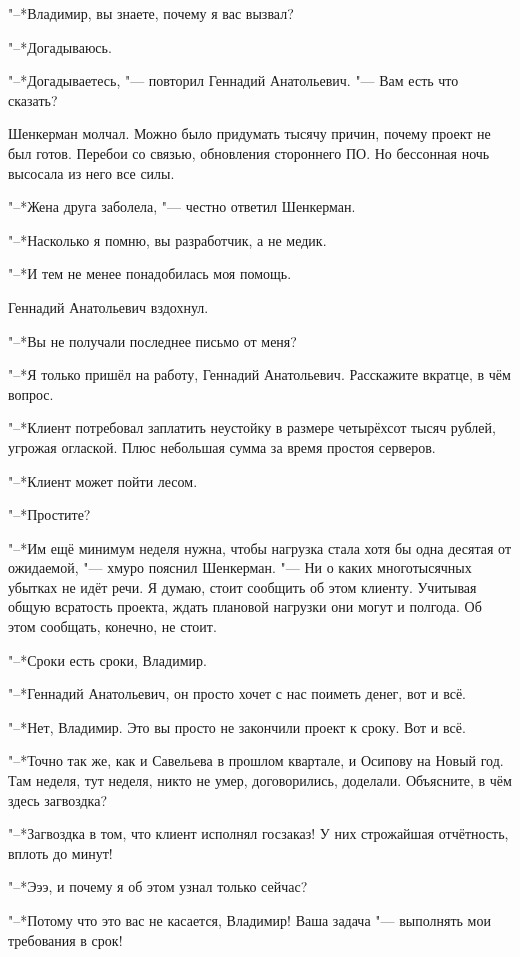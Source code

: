 "--*Владимир, вы знаете, почему я вас вызвал?

"--*Догадываюсь.

"--*Догадываетесь, "--- повторил Геннадий Анатольевич.
"--- Вам есть что сказать?

Шенкерман молчал.
Можно было придумать тысячу причин, почему проект не был готов.
Перебои со связью, обновления стороннего ПО.
Но бессонная ночь высосала из него все силы.

"--*Жена друга заболела, "--- честно ответил Шенкерман.

"--*Насколько я помню, вы разработчик, а не медик.

"--*И тем не менее понадобилась моя помощь.

Геннадий Анатольевич вздохнул.

"--*Вы не получали последнее письмо от меня?

"--*Я только пришёл на работу, Геннадий Анатольевич.
Расскажите вкратце, в чём вопрос.

"--*Клиент потребовал заплатить неустойку в размере четырёхсот тысяч рублей, угрожая оглаской.
Плюс небольшая сумма за время простоя серверов.

"--*Клиент может пойти лесом.

"--*Простите?

"--*Им ещё минимум неделя нужна, чтобы нагрузка стала хотя бы одна десятая от ожидаемой, "--- хмуро пояснил Шенкерман.
"--- Ни о каких многотысячных убытках не идёт речи.
Я думаю, стоит сообщить об этом клиенту.
Учитывая общую всратость проекта, ждать плановой нагрузки они могут и полгода.
Об этом сообщать, конечно, не стоит.

"--*Сроки есть сроки, Владимир.

"--*Геннадий Анатольевич, он просто хочет с нас поиметь денег, вот и всё.

"--*Нет, Владимир.
Это вы просто не закончили проект к сроку.
Вот и всё.

"--*Точно так же, как и Савельева в прошлом квартале, и Осипову на Новый год.
Там неделя, тут неделя, никто не умер, договорились, доделали.
Объясните, в чём здесь загвоздка?

"--*Загвоздка в том, что клиент исполнял госзаказ!
У них строжайшая отчётность, вплоть до минут!

"--*Эээ, и почему я об этом узнал только сейчас?

"--*Потому что это вас не касается, Владимир!
Ваша задача "--- выполнять мои требования в срок!

